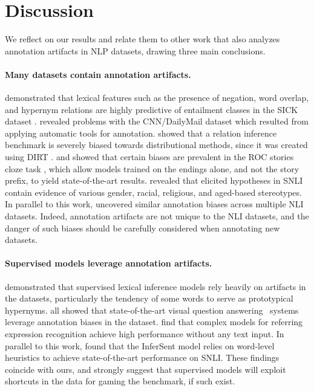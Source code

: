 \section{Discussion}

We reflect on our results and relate them to other work that also analyzes annotation artifacts in NLP datasets, drawing three main conclusions.

\paragraph{Many datasets contain annotation artifacts.}
\citet{Lai2014-cd} demonstrated that lexical features such as the presence of negation, word overlap, and hypernym relations are highly predictive of entailment classes in the SICK dataset \cite{Marelli:2014}. \citet{Chen:2016} revealed problems with the CNN/DailyMail dataset \cite{Hermann:2015} which resulted from applying automatic tools for annotation. 
\citet{Levy:2016} showed that a relation inference benchmark \cite{Zeichner:2012} is severely biased towards distributional methods, since it was created using DIRT \cite{Lin:2001}.
\citet{Schwartz:2017} and \citet{Cai:2017} showed that certain biases are prevalent in the ROC stories cloze task \cite{Mostafazadeh:2016},
which allow models trained on the endings alone, and not the story prefix, to yield state-of-the-art results. \citet{Rudinger2017SocialBI} revealed that elicited hypotheses in SNLI contain evidence of various gender, racial, religious, and aged-based stereotypes.  In parallel to this work, \citet{hypothesis-only-nli} uncovered similar annotation biases across multiple NLI datasets. Indeed, annotation artifacts are not unique to the NLI datasets, and the danger of such biases should be carefully considered when annotating new datasets.

\paragraph{Supervised models leverage annotation artifacts.}
 \citet{Levy:2015} demonstrated that supervised lexical inference models rely heavily on artifacts in the datasets, particularly the tendency of some words to serve as prototypical hypernyms. \citet{Agrawal:16,Jabri:2016,Goyal:17} all showed that state-of-the-art visual question answering~\cite{Antol:15} systems leverage annotation biases in the dataset. \citet{Cirik:18} find that complex models for referring expression recognition achieve high performance without any text input. In parallel to this work, \citet{Dasgupta2018-ry} found that the InferSent model \cite{conneau2017supervised} relies on word-level heuristics to achieve state-of-the-art performance on SNLI. These findings coincide with ours, and strongly suggest that supervised models will exploit shortcuts in the data for gaming the benchmark, if such exist.

